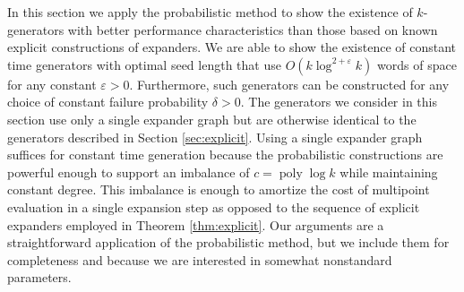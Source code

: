 \documentclass[a4paper,11pt]{article}
\theoremstyle{plain}
\theoremstyle{definition}
\DeclareMathOperator{\poly}{poly}
\begin{document}
In this section we apply the probabilistic method to show the existence of $k$-generators with better performance characteristics than those based on known explicit constructions of expanders. 
We are able to show the existence of constant time generators with optimal seed length that use $O(k\log^{2+\varepsilon}k)$ words of space for any constant $\varepsilon > 0$. 
Furthermore, such generators can be constructed for any choice of constant failure probability $\delta > 0$. 
The generators we consider in this section use only a single expander graph but are otherwise identical to the generators described in Section \ref{sec:explicit}.
Using a single expander graph suffices for constant time generation because the probabilistic constructions are powerful enough to support an imbalance of $c = \poly \log k$ while maintaining constant degree.
This imbalance is enough to amortize the cost of multipoint evaluation in a single expansion step as opposed to the sequence of explicit expanders employed in Theorem \ref{thm:explicit}. 
Our arguments are a straightforward application of the probabilistic method, but we include them for completeness and because we are interested in somewhat nonstandard parameters.
\end{document}
